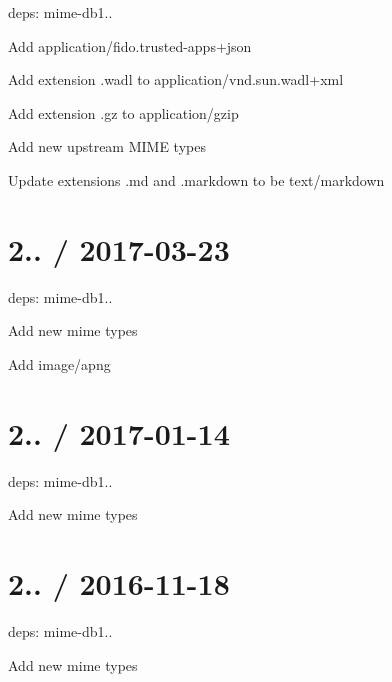 \begin{DoxyItemize}
\item deps\+: mime-\/db1..
\begin{DoxyItemize}
\item Add {\ttfamily application/fido.\+trusted-\/apps+json}
\item Add extension {\ttfamily .wadl} to {\ttfamily application/vnd.\+sun.\+wadl+xml}
\item Add extension {\ttfamily .gz} to {\ttfamily application/gzip}
\item Add new upstream M\+I\+ME types
\item Update extensions {\ttfamily .md} and {\ttfamily .markdown} to be {\ttfamily text/markdown}
\end{DoxyItemize}
\end{DoxyItemize}

\section*{2.. / 2017-\/03-\/23 }


\begin{DoxyItemize}
\item deps\+: mime-\/db1..
\begin{DoxyItemize}
\item Add new mime types
\item Add {\ttfamily image/apng}
\end{DoxyItemize}
\end{DoxyItemize}

\section*{2.. / 2017-\/01-\/14 }


\begin{DoxyItemize}
\item deps\+: mime-\/db1..
\begin{DoxyItemize}
\item Add new mime types
\end{DoxyItemize}
\end{DoxyItemize}

\section*{2.. / 2016-\/11-\/18 }


\begin{DoxyItemize}
\item deps\+: mime-\/db1..
\begin{DoxyItemize}
\item Add new mime types
\end{DoxyItemize}
\end{DoxyItemize}

